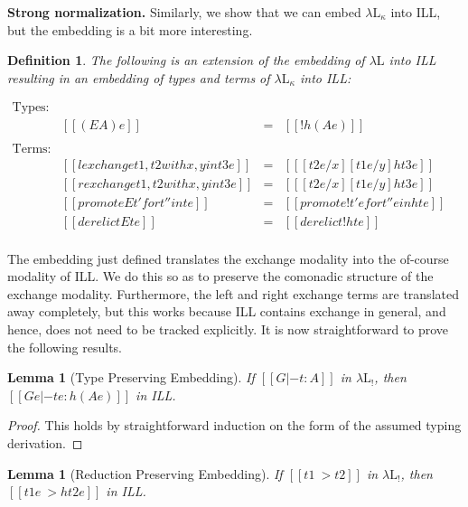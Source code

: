 \documentclass{article}
\newtheorem{lemma}[theorem]{Lemma}
\newtheorem{definition}[theorem]{Definition}
\begin{document}
\textbf{Strong normalization.}  Similarly, we show that we can embed
$\lambda\text{L}_\kappa$ into ILL, but the embedding is a bit more
interesting.

\begin{definition}
  \label{def:embed-lambda-L!-in-ILL}
  The following is an extension of the embedding of $\lambda\text{L}$
  into ILL resulting in an embedding of types and terms of
  $\lambda\text{L}_\kappa$ into ILL:
  \begin{center}
    \begin{math}
      \begin{array}{lrllllllllllllllllll}
        \text{Types:}\\
        & [[(E A) e]] & = & [[! h(A e)]]\\        
        \\
        \text{Terms:}\\
        & [[{lexchange t1 , t2 with x , y in t3} e]] & = & [[ [t2 e/x][t1 e/y]h{t3 e}]]\\
        & [[{rexchange t1 , t2 with x , y in t3} e]] & = & [[ [t2 e/x][t1 e/y]h{t3 e}]]\\
        & [[{promoteE t' for t'' in t} e]] & = & [[promote! t' e for t'' e in h{t e}]]\\
        & [[{derelictE t} e]] & = & [[derelict! h{t e}]]\\
      \end{array}
    \end{math}
  \end{center}
\end{definition}
The embedding just defined translates the exchange modality into the
of-course modality of ILL.  We do this so as to preserve the comonadic
structure of the exchange modality.  Furthermore, the left and right
exchange terms are translated away completely, but this works because
ILL contains exchange in general, and hence, does not need to be
tracked explicitly.  It is now straightforward to prove the following
results.
\begin{lemma}[Type Preserving Embedding]
  \label{lemma:type_preserving_embedding_lambdaL!}
  If $[[G |- t : A]]$ in $\lambda\text{L}_!$, then
  $[[G e |- t e : h(A e)]]$ in ILL.
\end{lemma}
\begin{proof}
  This holds by straightforward induction on the form of the assumed
  typing derivation.
\end{proof}
\begin{lemma}[Reduction Preserving Embedding]
  \label{lemma:reduction_preserving_embedding_lambdaL!}
  If $[[t1 ~> t2]]$ in $\lambda\text{L}_!$, then $[[t1 e ~> h{t2 e}]]$
  in ILL.
\end{lemma}
\end{document}

